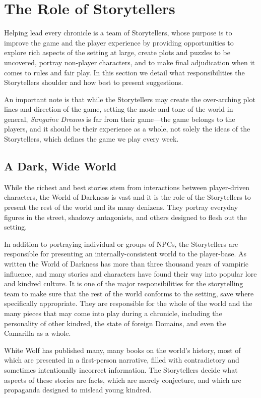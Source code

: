 \section{The Role of Storytellers}
\label{sec:sts}
Helping lead every chronicle is a team of Storytellers, whose purpose is to 
improve the game and the player experience by providing opportunities to explore 
rich aspects of the setting at large, create plots and puzzles to be uncovered, 
portray non-player characters, and to make final adjudication when it comes to 
rules and fair play.  In this section we detail what responsibilities the 
Storytellers shoulder and how best to present suggestions.

An important note is that while the Storytellers may create the over-arching plot 
lines and direction of the game, setting the mode and tone of the world in general, 
\emph{Sanguine Dreams} is far from their game---the game belongs to the players, 
and it should be their experience as a whole, not solely the ideas of the 
Storytellers, which defines the game we play every week.

\subsection{A Dark, Wide World}
While the richest and best stories stem from interactions between player-driven 
characters, the World of Darkness is vast and it is the role of the Storytellers 
to present the rest of the world and its many denizens.  They portray everyday 
figures in the street, shadowy antagonists, and others designed to flesh out the 
setting.

In addition to portraying individual or groups of NPCs, the Storytellers are 
responsible for presenting an internally-consistent world to the player-base. As 
written the World of Darkness has more than three thousand years of vampiric 
influence, and many stories and characters have found their way into popular lore 
and kindred culture.  It is one of the major responsibilities for the storytelling 
team to make sure that the rest of the world conforms to the setting, save where 
specifically appropriate.  They are responsible for the whole of the world and the 
many pieces that may come into play during a chronicle, including the personality of 
other kindred, the state of foreign Domains, and even the Camarilla as a whole.

White Wolf has published many, many books on the world's history, most of which are 
presented in a first-person narrative, filled with contradictory and sometimes 
intentionally incorrect information.  The Storytellers decide what aspects of these 
stories are facts, which are merely conjecture, and which are propaganda designed 
to mislead young kindred.

